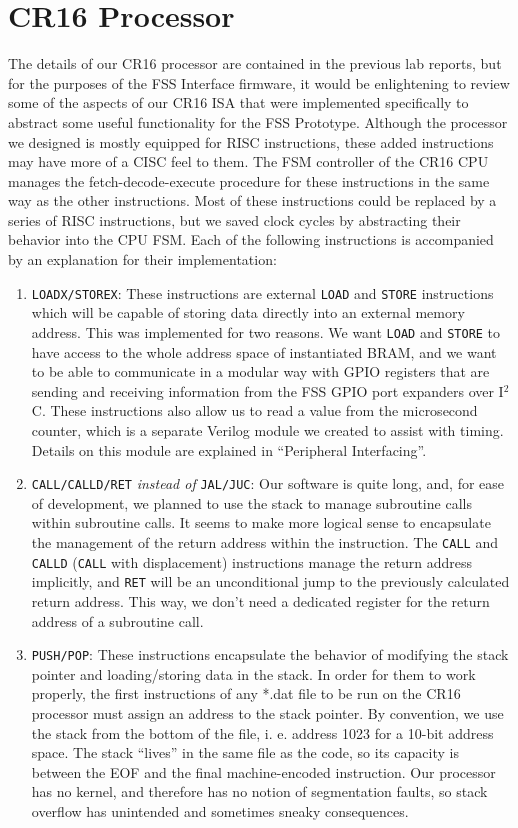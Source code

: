 \documentclass[conference]{IEEEtran}
\begin{document}
\section{CR16 Processor}
The details of our CR16 processor are contained in the previous lab reports, but for the purposes of the FSS Interface firmware, it would be enlightening to review some of the aspects of our CR16 ISA that were implemented specifically to abstract some useful functionality for the FSS Prototype. Although the processor we designed is mostly equipped for RISC instructions, these added instructions may have more of a CISC feel to them. The FSM controller of the CR16 CPU manages the fetch-decode-execute procedure for these instructions in the same way as the other instructions. Most of these instructions could be replaced by a series of RISC instructions, but we saved clock cycles by abstracting their behavior into the CPU FSM. Each of the following instructions is accompanied by an explanation for their implementation:
\begin{enumerate}
    \item \verb|LOADX/STOREX|: These instructions are external \verb|LOAD| and \verb|STORE| instructions which will be capable of storing data directly into an external memory address. This was implemented for two reasons. We want \verb|LOAD| and \verb|STORE| to have access to the whole address space of instantiated BRAM, and we want to be able to communicate in a modular way with GPIO registers that are sending and receiving information from the FSS GPIO port expanders over I$^2$C. These instructions also allow us to read a value from the microsecond counter, which is a separate Verilog module we created to assist with timing. Details on this module are explained in ``Peripheral Interfacing''.
    \item \verb|CALL/CALLD/RET| \textit{instead of} \verb|JAL/JUC|: Our software is quite long, and, for ease of development, we planned to use the stack to manage subroutine calls within subroutine calls. It seems to make more logical sense to encapsulate the management of the return address within the instruction. The \verb|CALL| and \verb|CALLD| (\verb|CALL| with displacement) instructions manage the return address implicitly, and \verb|RET| will be an unconditional jump to the previously calculated return address. This way, we don't need a dedicated register for the return address of a subroutine call.
    \item \verb|PUSH/POP|: These instructions encapsulate the behavior of modifying the stack pointer and loading/storing data in the stack. In order for them to work properly, the first instructions of any *.dat file to be run on the CR16 processor must assign an address to the stack pointer. By convention, we use the stack from the bottom of the file, i. e. address 1023 for a 10-bit address space. The stack ``lives'' in the same file as the code, so its capacity is between the EOF and the final machine-encoded instruction. Our processor has no kernel, and therefore has no notion of segmentation faults, so stack overflow has unintended and sometimes sneaky consequences.
\end{enumerate}
\end{document}
